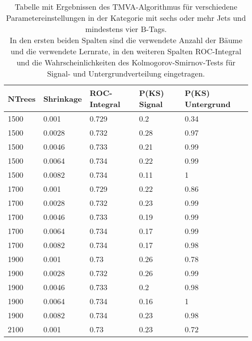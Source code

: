 \begin{table}[tbp]\parbox{12cm}{
  \caption[TMVA 6j4t Ergebnisse]{Tabelle mit Ergebnissen des TMVA-Algorithmus f\"ur verschiedene Parametereinstellungen in der Kategorie mit sechs oder mehr Jets und mindestens vier B-Tags.\\In den ersten beiden Spalten sind die verwendete Anzahl der B\"aume und die verwendete Lernrate, in den weiteren Spalten ROC-Integral und die Wahrscheinlichkeiten des Kolmogorov-Smirnov-Tests f\"ur Signal- und Untergrundverteilung eingetragen.}%
  }\label{tab:tmva_6j4t}
  \begin{center}
  \begin{tabular}{lllll}
  \hline
  NTrees & Shrinkage & ROC-Integral & P(KS) Signal & P(KS) Untergrund\\
  \hline
 \num{1500}  & \num{0,001}   & \num{0,729} & \num{0,2}  & \num{0,34}\\
 \num{1500}  & \num{0,0028}  & \num{0,732} & \num{0,28} & \num{0,97}\\
 \num{1500}  & \num{0,0046}  & \num{0,733} & \num{0,21} & \num{0,99}\\
 \num{1500}  & \num{0,0064}  & \num{0,734} & \num{0,22} & \num{0,99}\\
 \num{1500}  & \num{0,0082}  & \num{0,734} & \num{0,11} & \num{1}\\
 \num{1700}  & \num{0,001}   & \num{0,729} & \num{0,22} & \num{0,86}\\
 \num{1700}  & \num{0,0028}  & \num{0,732} & \num{0,23} & \num{0,99}\\
 \num{1700}  & \num{0,0046}  & \num{0,733} & \num{0,19} & \num{0,99}\\
 \num{1700}  & \num{0,0064}  & \num{0,734} & \num{0,17} & \num{0,99}\\
 \num{1700}  & \num{0,0082}  & \num{0,734} & \num{0,17} & \num{0,98}\\
 \num{1900}  & \num{0,001}   & \num{0,73}  & \num{0,26} & \num{0,78}\\
 \num{1900}  & \num{0,0028}  & \num{0,732} & \num{0,26} & \num{0,99}\\
 \num{1900}  & \num{0,0046}  & \num{0,733} & \num{0,2}  & \num{0,98}\\
 \num{1900}  & \num{0,0064}  & \num{0,734} & \num{0,16} & \num{1}\\
 \num{1900}  & \num{0,0082}  & \num{0,734} & \num{0,23} & \num{0,98}\\
 \num{2100}  & \num{0,001}   & \num{0,73}  & \num{0,23} & \num{0,72}\\

\end{tabular}
\end{center}
\end{table}
